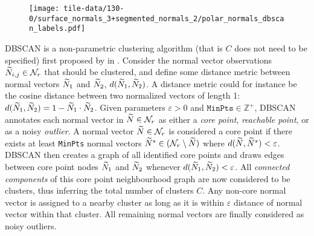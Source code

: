 \begin{wrapfigure}{r}{0.35\textwidth}
  \begin{center}
    \texttt{[image: tile-data/130-0/surface\_normals\_3+segmented\_normals\_2/polar\_normals\_dbscan\_labels.pdf]}
  \end{center}
  \label{fig:polar-normal-dbscan-labels}
\end{wrapfigure}
DBSCAN is a non-parametric clustering algorithm (that is $C$ does not need to be specified) first proposed by \citeauthor{dbscan} in \citeyear{dbscan} \cite{dbscan}.
Consider the normal vector observations $\widetilde{N}_{i,j} \in \mathcal{N}_r$ that should be clustered, and define some distance metric between normal vectors $\widetilde{N}_1$ and $\widetilde{N}_2$, $d(\widetilde{N}_1, \widetilde{N}_2)$.
A distance metric could for instance be the cosine distance between two normalized vectors of length 1: $d(\widetilde{N}_1, \widetilde{N}_2) = 1 - \widetilde{N}_1 \cdot \widetilde{N}_2$.
Given parameters $\varepsilon > 0$ and $\texttt{MinPts} \in \mathbb{Z}^+$, DBSCAN annotates each normal vector in $\widetilde{N} \in \mathcal{N}_r$ as either a \textit{core point}, \textit{reachable point}, or as a noisy \textit{outlier}.
A normal vector $\widetilde{N} \in \mathcal{N}_r$ is considered a core point if there exists at least \texttt{MinPts} normal vectors $\widetilde{N}^* \in (\mathcal{N}_{r} \setminus \widetilde{N})$ where $d(\widetilde{N}, \widetilde{N}^*) < \varepsilon$.
DBSCAN then creates a graph of all identified core points and draws edges between core point nodes $\widetilde{N}_1$ and $\widetilde{N}_2$ whenever $d(\widetilde{N}_1, \widetilde{N}_2) < \varepsilon$.
All \textit{connected components} of this core point neighbourhood graph are now considered to be clusters, thus inferring the total number of clusters $C$.
Any non-core normal vector is assigned to a nearby cluster as long as it is within $\varepsilon$ distance of normal vector within that cluster.
All remaining normal vectors are finally considered as noisy outliers.

